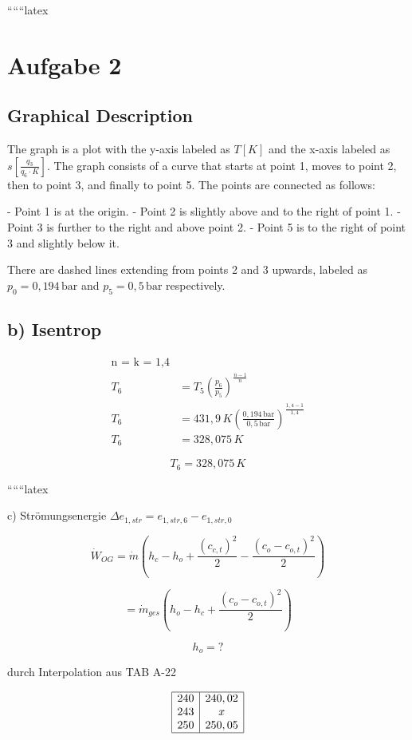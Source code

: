 
``````latex


\section*{Aufgabe 2}

\subsection*{Graphical Description}

The graph is a plot with the y-axis labeled as $T [K]$ and the x-axis labeled as $s \left[ \frac{q_3}{q_6 \cdot K} \right]$. The graph consists of a curve that starts at point 1, moves to point 2, then to point 3, and finally to point 5. The points are connected as follows:

- Point 1 is at the origin.
- Point 2 is slightly above and to the right of point 1.
- Point 3 is further to the right and above point 2.
- Point 5 is to the right of point 3 and slightly below it.

There are dashed lines extending from points 2 and 3 upwards, labeled as $p_0 = 0,194 \, \text{bar}$ and $p_5 = 0,5 \, \text{bar}$ respectively.

\subsection*{b) Isentrop}

\begin{align*}
\text{n = k = 1,4} \\
T_6 &= T_5 \left( \frac{p_6}{p_5} \right)^{\frac{n-1}{n}} \\
T_6 &= 431,9 \, K \left( \frac{0,194 \, \text{bar}}{0,5 \, \text{bar}} \right)^{\frac{1,4-1}{1,4}} \\
T_6 &= 328,075 \, K
\end{align*}

\[
\boxed{T_6 = 328,075 \, K}
\]

``````latex


c) Strömungsenergie $\Delta e_{1,str} = e_{1,str,6} - e_{1,str,0}$

\[
\dot{W}_{OG} = \dot{m} \left( h_c - h_o + \frac{(c_{c,t})^2}{2} - \frac{(c_o - c_{o,t})^2}{2} \right)
\]

\[
= \dot{m}_{ges} \left( h_o - h_c + \frac{(c_o - c_{o,t})^2}{2} \right)
\]

\[
h_o = ?
\]

durch Interpolation aus TAB A-22

\[
\begin{array}{|c|c|}
\hline
240 & 240,02 \\
243 & x \\
250 & 250,05 \\
\hline
\end{array}
\]

